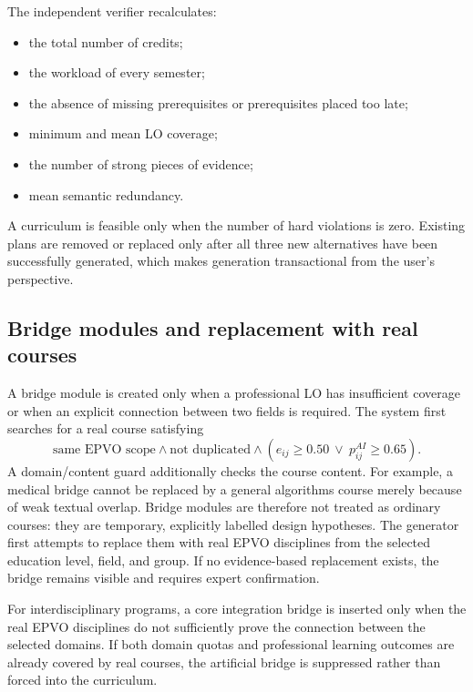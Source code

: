 \documentclass[twoside,11pt]{article}
\begin{document}
The independent verifier recalculates:
\begin{itemize}
  \item the total number of credits;
  \item the workload of every semester;
  \item the absence of missing prerequisites or prerequisites placed too late;
  \item minimum and mean LO coverage;
  \item the number of strong pieces of evidence;
  \item mean semantic redundancy.
\end{itemize}
A curriculum is feasible only when the number of hard violations is zero. Existing plans are removed or replaced only after all three new alternatives have been successfully generated, which makes generation transactional from the user's perspective.

\subsection{Bridge modules and replacement with real courses}

A bridge module is created only when a professional LO has insufficient coverage or when an explicit connection between two fields is required. The system first searches for a real course satisfying
\begin{equation}
  \text{same EPVO scope}
  \land
  \text{not duplicated}
  \land
  (e_{ij}\ge0.50\ \lor\ p_{ij}^{AI}\ge0.65).
  \label{eq:bridge-replacement}
\end{equation}
A domain/content guard additionally checks the course content. For example, a medical bridge cannot be replaced by a general algorithms course merely because of weak textual overlap. Bridge modules are therefore not treated as ordinary courses: they are temporary, explicitly labelled design hypotheses. The generator first attempts to replace them with real EPVO disciplines from the selected education level, field, and group. If no evidence-based replacement exists, the bridge remains visible and requires expert confirmation.

For interdisciplinary programs, a core integration bridge is inserted only when the real EPVO disciplines do not sufficiently prove the connection between the selected domains. If both domain quotas and professional learning outcomes are already covered by real courses, the artificial bridge is suppressed rather than forced into the curriculum.
\end{document}
